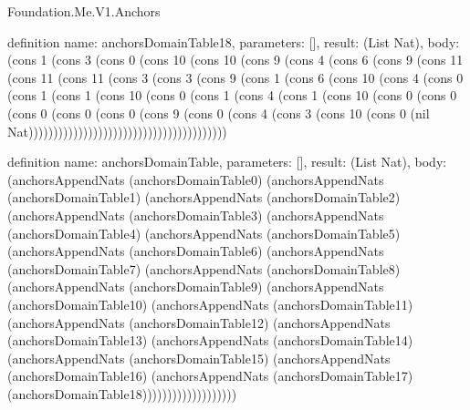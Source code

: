 \begin{lexlean}{Foundation.Me.V1.Anchors}
\begin{semanticmodule}
definition{
  name: anchorsDomainTable18,
  parameters: [],
  result: (List Nat),
  body: (cons 1 (cons 3 (cons 0 (cons 10 (cons 10 (cons 9 (cons 4 (cons 6 (cons 9 (cons 11 (cons 11 (cons 11 (cons 3 (cons 3 (cons 9 (cons 1 (cons 6 (cons 10 (cons 4 (cons 0 (cons 1 (cons 1 (cons 10 (cons 0 (cons 1 (cons 4 (cons 1 (cons 10 (cons 0 (cons 0 (cons 0 (cons 0 (cons 0 (cons 9 (cons 0 (cons 4 (cons 3 (cons 10 (cons 0 (nil Nat))))))))))))))))))))))))))))))))))))))))
}

definition{
  name: anchorsDomainTable,
  parameters: [],
  result: (List Nat),
  body: (anchorsAppendNats (anchorsDomainTable0) (anchorsAppendNats (anchorsDomainTable1) (anchorsAppendNats (anchorsDomainTable2) (anchorsAppendNats (anchorsDomainTable3) (anchorsAppendNats (anchorsDomainTable4) (anchorsAppendNats (anchorsDomainTable5) (anchorsAppendNats (anchorsDomainTable6) (anchorsAppendNats (anchorsDomainTable7) (anchorsAppendNats (anchorsDomainTable8) (anchorsAppendNats (anchorsDomainTable9) (anchorsAppendNats (anchorsDomainTable10) (anchorsAppendNats (anchorsDomainTable11) (anchorsAppendNats (anchorsDomainTable12) (anchorsAppendNats (anchorsDomainTable13) (anchorsAppendNats (anchorsDomainTable14) (anchorsAppendNats (anchorsDomainTable15) (anchorsAppendNats (anchorsDomainTable16) (anchorsAppendNats (anchorsDomainTable17) (anchorsDomainTable18)))))))))))))))))))
}


\end{semanticmodule}
\end{lexlean}

